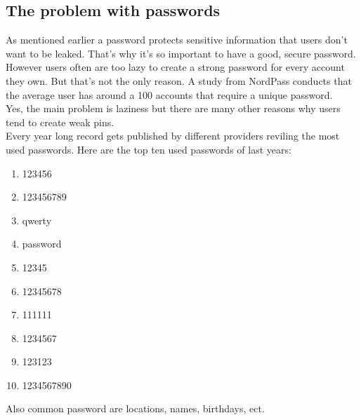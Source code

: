 \documentclass[conference]{IEEEtran}
\begin{document}
\subsection{The problem with passwords}
As mentioned earlier a password protects sensitive information that users don't want to be leaked. That's why it's so important to have a good, secure password. However users often are too lazy to create a strong password for every account they own. But that's not the only reason. A study from NordPass conducts that the average user has around a 100 accounts that require a unique password. \\
Yes, the main problem is laziness but there are many other reasons why users tend to create weak pins.\\
Every year long record gets published by different providers reviling the most used passwords. Here are the top ten used passwords of last years:
\vspace{0.5cm}
\begin{enumerate}
\item 123456
\item 123456789
\item qwerty
\item password
\item 12345
\item 12345678
\item 111111
\item 1234567
\item 123123
\item 1234567890
\end{enumerate}

Also common password are locations, names, birthdays, ect.
\end{document}
